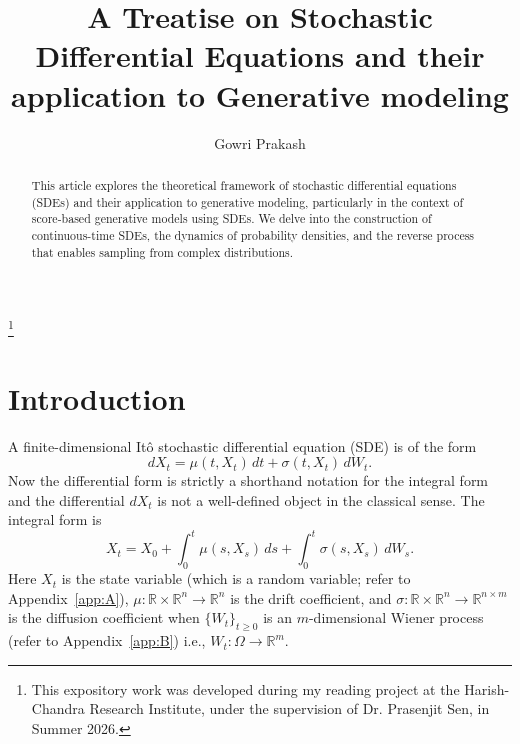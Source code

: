 \documentclass[11pt]{amsart}
\theoremstyle{plain}
\theoremstyle{definition}
\theoremstyle{remark}
\numberwithin{equation}{section}
\begin{document}
\title[SDEs and Generative modeling]{A Treatise on Stochastic Differential Equations and their application to Generative modeling}

\author{Gowri Prakash}
\address{Department of Physics, Indian Institute of Science Education and Research, Tirupati, India.}

\thanks{This expository work was developed during my reading project at the Harish-Chandra Research Institute, under the supervision of Dr. Prasenjit Sen, in Summer 2026.}

\subjclass[2020]{}
\keywords{}

\begin{abstract}
This article explores the theoretical framework of stochastic differential equations (SDEs) and their application to generative modeling, particularly in the context of score-based generative models using SDEs. We delve into the construction of continuous-time SDEs, the dynamics of probability densities, and the reverse process that enables sampling from complex distributions. 
\end{abstract}

\maketitle

\section{Introduction}

A finite-dimensional It\^{o} stochastic differential equation (SDE) is of the form
\begin{equation}
    dX_t = \mu(t, X_t)\,dt + \sigma(t, X_t)\,dW_t.
\end{equation}
Now the differential form is strictly a shorthand notation for the integral form and the differential $dX_t$ is not a well-defined object in the classical sense.
The integral form is
\begin{equation}
    X_t = X_0 + \int_0^t \mu(s, X_s)\,ds + \int_0^t \sigma(s, X_s)\,dW_s.
    \label{eq:sde soln}
\end{equation}
Here $X_t$ is the state variable (which is a random variable; refer to Appendix~\ref{app:A}), $\mu:\mathbb{R}\times \mathbb{R}^n \to \mathbb{R}^n$ is the drift coefficient, and $\sigma:\mathbb{R}\times \mathbb{R}^n \to \mathbb{R}^{n \times m}$ is the diffusion coefficient when $\{W_t\}_{t \geq 0}$ is an $m$-dimensional Wiener process (refer to Appendix~\ref{app:B}) i.e., $W_t: \Omega \to \mathbb{R}^m$.\\
\end{document}
